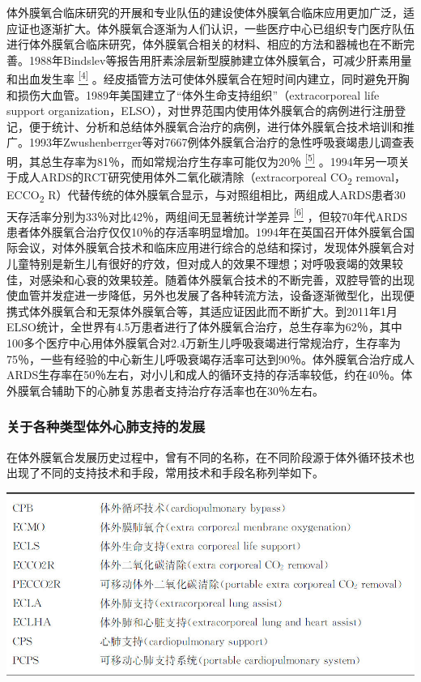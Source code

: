 体外膜氧合临床研究的开展和专业队伍的建设使体外膜氧合临床应用更加广泛，适应证也逐渐扩大。体外膜氧合逐渐为人们认识，一些医疗中心已组织专门医疗队伍进行体外膜氧合临床研究，体外膜氧合相关的材料、相应的方法和器械也在不断完善。1988年Bindslev等报告用肝素涂层新型膜肺建立体外膜氧合，可减少肝素用量和出血发生率
\protect\hyperlink{text00030.htmlux5cux23ch4-29}{\textsuperscript{{[}4{]}}}
。经皮插管方法可使体外膜氧合在短时间内建立，同时避免开胸和损伤大血管。1989年美国建立了“体外生命支持组织”（extracorporeal
life support
organization，ELSO），对世界范围内使用体外膜氧合的病例进行注册登记，便于统计、分析和总结体外膜氧合治疗的病例，进行体外膜氧合技术培训和推广。1993年Zwushenberrger等对7667例体外膜氧合治疗的急性呼吸衰竭患儿调查表明，其总生存率为81％，而如常规治疗生存率可能仅为20％
\protect\hyperlink{text00030.htmlux5cux23ch5-29}{\textsuperscript{{[}5{]}}}
。1994年另一项关于成人ARDS的RCT研究使用体外二氧化碳清除（extracorporeal
CO\textsubscript{2} removal，ECCO\textsubscript{2}
R）代替传统的体外膜氧合显示，与对照组相比，两组成人ARDS患者30天存活率分别为33％对比42％，两组间无显著统计学差异
\protect\hyperlink{text00030.htmlux5cux23ch6-29}{\textsuperscript{{[}6{]}}}
，但较70年代ARDS患者体外膜氧合治疗仅仅10％的存活率明显增加。1994年在英国召开体外膜氧合国际会议，对体外膜氧合技术和临床应用进行综合的总结和探讨，发现体外膜氧合对儿童特别是新生儿有很好的疗效，但对成人的效果不理想；对呼吸衰竭的效果较佳，对感染和心衰的效果较差。随着体外膜氧合技术的不断完善，双腔导管的出现使血管并发症进一步降低，另外也发展了各种转流方法，设备逐渐微型化，出现便携式体外膜氧合和无泵体外膜氧合等，其适应证因此而不断扩大。到2011年1月ELSO统计，全世界有4.5万患者进行了体外膜氧合治疗，总生存率为62％，其中100多个医疗中心用体外膜氧合对2.4万新生儿呼吸衰竭进行常规治疗，生存率为75％，一些有经验的中心新生儿呼吸衰竭存活率可达到90％。体外膜氧合治疗成人ARDS生存率在50％左右，对小儿和成人的循环支持的存活率较低，约在40％。体外膜氧合辅助下的心肺复苏患者支持治疗存活率也在30％左右。

\subsubsection{关于各种类型体外心肺支持的发展}

在体外膜氧合发展历史过程中，曾有不同的名称，在不同阶段源于体外循环技术也出现了不同的支持技术和手段，常用技术和手段名称列举如下。

\begin{center}
\includegraphics{./images/Image00279.jpg}
\end{center}

